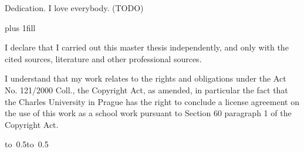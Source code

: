 \documentclass[12pt,a4paper]{report}
\let\openright=\clearpage
\begin{document}
\newpage



\openright

\noindent
Dedication. I love everybody. (TODO)

\newpage


\vglue 0pt plus 1fill

\noindent
I declare that I carried out this master thesis independently, and only with the cited
sources, literature and other professional sources.

\medskip\noindent
I understand that my work relates to the rights and obligations under the Act No.
121/2000 Coll., the Copyright Act, as amended, in particular the fact that the Charles
University in Prague has the right to conclude a license agreement on the use of this
work as a school work pursuant to Section 60 paragraph 1 of the Copyright Act.

\vspace{10mm}

\hbox{\hbox to 0.5\hbox to 0.5}

\vspace{20mm}
\newpage

\end{document}
